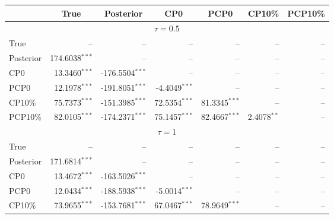 { \renewcommand{\arraystretch}{1.2} 
 {\footnotesize 
\begin{table} 
\center 
\begin{tabular}{l | rrrrrr} 
& \multicolumn{1}{c}{True}& \multicolumn{1}{c}{Posterior}& \multicolumn{1}{c}{CP0}& \multicolumn{1}{c}{PCP0}& \multicolumn{1}{c}{CP10\%}& \multicolumn{1}{c}{PCP10\%} \\ \hline 
\multicolumn{7}{c}{$\tau = 0.5$} \\ \hline 
True &    --\phantom{$^{***}$} &    --\phantom{$^{***}$} &    --\phantom{$^{***}$} &    --\phantom{$^{***}$} &    --\phantom{$^{***}$} &    --\phantom{$^{***}$}   \\ 
Posterior & 174.6038$^{***}$ &    --\phantom{$^{***}$} &    --\phantom{$^{***}$} &    --\phantom{$^{***}$} &    --\phantom{$^{***}$} &    --\phantom{$^{***}$}   \\ 
CP0 & 13.3460$^{***}$ & -176.5504$^{***}$ &    --\phantom{$^{***}$} &    --\phantom{$^{***}$} &    --\phantom{$^{***}$} &    --\phantom{$^{***}$}   \\ 
PCP0 & 12.1978$^{***}$ & -191.8051$^{***}$ & -4.4049$^{***}$ &    --\phantom{$^{***}$} &    --\phantom{$^{***}$} &    --\phantom{$^{***}$}   \\ 
CP10\% & 75.7373$^{***}$ & -151.3985$^{***}$ & 72.5354$^{***}$ & 81.3345$^{***}$ &    --\phantom{$^{***}$} &    --\phantom{$^{***}$}   \\ 
PCP10\% & 82.0105$^{***}$ & -174.2371$^{***}$ & 75.1457$^{***}$ & 82.4667$^{***}$ & 2.4078$^{**}$\phantom{$^{*}$} &    --\phantom{$^{***}$}   \\ 
\hline 
\multicolumn{7}{c}{$\tau = 1$} \\ \hline 
True &    --\phantom{$^{***}$} &    --\phantom{$^{***}$} &    --\phantom{$^{***}$} &    --\phantom{$^{***}$} &    --\phantom{$^{***}$} &    --\phantom{$^{***}$}   \\ 
Posterior & 171.6814$^{***}$ &    --\phantom{$^{***}$} &    --\phantom{$^{***}$} &    --\phantom{$^{***}$} &    --\phantom{$^{***}$} &    --\phantom{$^{***}$}   \\ 
CP0 & 13.4672$^{***}$ & -163.5026$^{***}$ &    --\phantom{$^{***}$} &    --\phantom{$^{***}$} &    --\phantom{$^{***}$} &    --\phantom{$^{***}$}   \\ 
PCP0 & 12.0434$^{***}$ & -188.5938$^{***}$ & -5.0014$^{***}$ &    --\phantom{$^{***}$} &    --\phantom{$^{***}$} &    --\phantom{$^{***}$}   \\ 
CP10\% & 73.9655$^{***}$ & -153.7681$^{***}$ & 67.0467$^{***}$ & 78.9649$^{***}$ &    --\phantom{$^{***}$} &    --\phantom{$^{***}$}   \\ 

\end{tabular}
\end{table}}}
